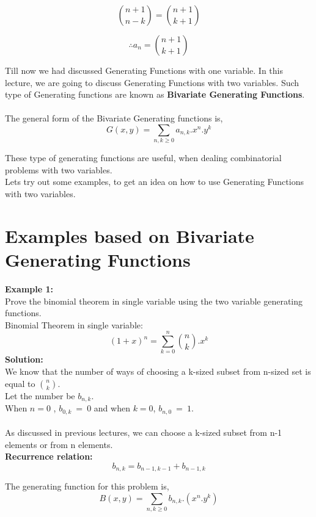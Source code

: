 $${n+1 \choose n-k} = {n+1 \choose k+1}$$

$$\boxed{\therefore a_n = {n+1 \choose k+1}}$$


Till now we had discussed Generating Functions with one variable. In this lecture, we are going to discuss Generating Functions with two variables. Such type of Generating functions are known as \textbf{Bivariate Generating Functions}.\\ \\

The general form of the Bivariate Generating functions is,$$G(x,y) = \sum_{n,k \geq 0} a_{n,k}.x^n.y^k$$

These type of generating functions are useful, when dealing combinatorial problems with two variables.\\
Lets try out some examples, to get an idea on how to use Generating Functions with two variables.

\section{Examples based on Bivariate Generating Functions}
\textbf{Example 1:}\\ Prove the binomial theorem in single variable using the two variable generating functions.\\
Binomial Theorem in single variable:
$${\left(1+x\right)}^{n} = \sum_{k=0}^{n}{n \choose k}.x^k$$
\textbf{Solution:}\\

We know that the number of ways of choosing a k-sized subset from n-sized set is equal to ${n \choose k}$.\\

Let the number be $b_{n,k}$.
\\
When $n=0$ , $b_{0,k}~=~0$ and when $k=0$, $b_{n,0}~=~1$.\\
\\
As discussed in previous lectures, we can choose a k-sized subset from n-1 elements or from n elements.
\\
\textbf{Recurrence relation:}
$$b_{n,k} = b_{n-1,k-1} + b_{n-1,k} $$

The generating function for this problem is,
\begin{equation}
B(x,y) = \sum_{n,k \geq 0}b_{n,k}.\left(x^n.y^k \right)
\end{equation}


